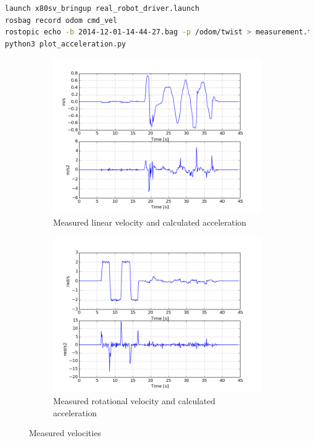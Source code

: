 \documentclass[a4paper]{article}
\begin{document}
\begin{lstlisting}[language=bash,caption={commands to determine robot limitations},
    label=lst:robotlimits]
launch x80sv_bringup real_robot_driver.launch
rosbag record odom cmd_vel
rostopic echo -b 2014-12-01-14-44-27.bag -p /odom/twist > measurement.txt
python3 plot_acceleration.py
\end{lstlisting}


\begin{figure}[h!]
  \centering
  \begin{subfigure}[b]{0.8\textwidth}
    \includegraphics[width=\textwidth,height=\textheight,keepaspectratio]{img/v.png}
    \caption{Measured linear velocity and calculated acceleration}
  \end{subfigure}
  \begin{subfigure}[b]{0.8\textwidth}
    \includegraphics[width=\textwidth,height=\textheight,keepaspectratio]{img/omega.png}
    \caption{Measured rotational velocity and calculated acceleration}
  \end{subfigure}
  \caption{Measured velocities}
  \label{fig:robotlimits}
\end{figure}
\end{document}
